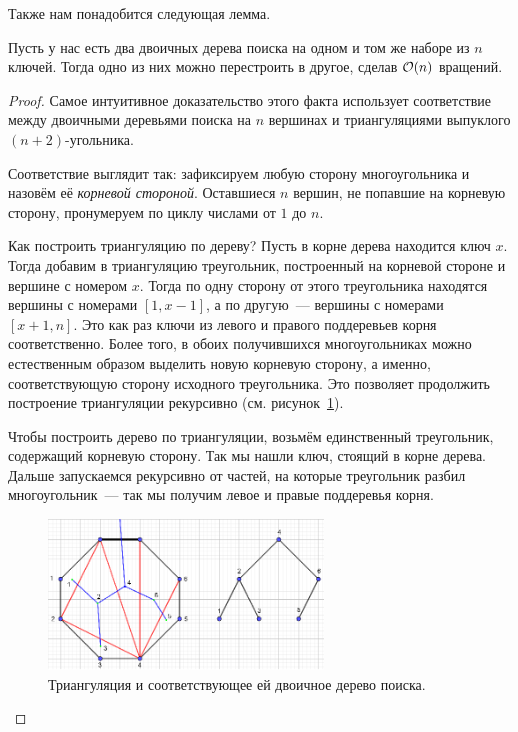Также нам понадобится следующая лемма.

\begin{lemma}\label{tree_distance} Пусть у нас есть два двоичных дерева поиска на одном и том же наборе из $n$ ключей. Тогда одно из них можно перестроить в другое, сделав $\mathcal{O}(n)$ вращений.
\end{lemma}
\begin{proof} Самое интуитивное доказательство этого факта использует соответствие
	между двоичными деревьями поиска на $n$ вершинах и триангуляциями выпуклого $(n + 2)$-угольника.

	Соответствие выглядит так: зафиксируем любую сторону многоугольника и назовём её \emph{корневой стороной}. Оставшиеся $n$ вершин, не попавшие на корневую сторону,
	пронумеруем по циклу числами от $1$ до $n$.

	Как построить триангуляцию по дереву?
	Пусть в корне дерева находится ключ $x$. Тогда добавим в триангуляцию треугольник, построенный на корневой стороне и вершине с номером $x$. Тогда по одну сторону от этого
	треугольника находятся вершины с номерами $[1, x - 1]$, а по другую~---
	вершины с номерами $[x + 1, n]$. Это как раз ключи из левого и правого поддеревьев
	корня соответственно. Более того, в обоих получившихся многоугольниках можно естественным образом выделить новую корневую сторону, а именно, соответствующую сторону исходного треугольника. Это позволяет продолжить построение триангуляции рекурсивно (см. рисунок~\ref{triangulation_tree}).

	Чтобы построить дерево по триангуляции, возьмём единственный треугольник, содержащий корневую сторону. Так мы нашли ключ, стоящий в корне дерева. Дальше запускаемся рекурсивно от частей, на которые треугольник разбил многоугольник~--- так мы получим левое и правые поддеревья корня.
	\begin{figure}
		\includegraphics[height=4cm]{img/tree_and_triangulation.png}
		\caption{Триангуляция и соответствующее ей двоичное дерево поиска.}
		\label{triangulation_tree}
	\end{figure}


\end{proof}
